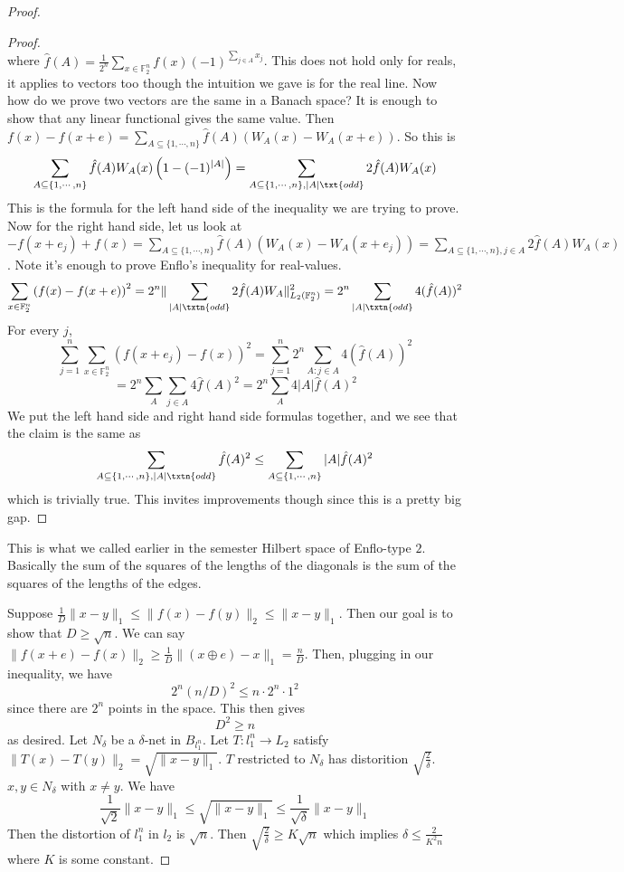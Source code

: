 \begin{proof}
\begin{proof}
\[\]
where $\hat{f}(A) = \frac{1}{2^n}\sum_{x \in \mathbb{F}_2^n} f(x)(-1)^{\sum_{j \in A}x_j}$.
This does not hold only for reals, it applies to vectors too though the intuition we gave is for the real line. 
Now how do we prove two vectors are the same in a Banach space? It is enough to show that any linear functional gives the same value. 
Then $f(x) - f(x + e) = \sum_{A \subseteq \{1, \cdots, n\}} \hat{f}(A)\left(W_A(x) - W_A(x + e)\right)$. So this is 
\[
\sum_{A \subseteq \{1, \cdots, n\}} \hat{f}(A)W_A(x)\left(1 - (-1)^{|A|}\right) = \sum_{A \subseteq \{1, \cdots, n\}, |A| \txt{ odd}} 2\hat{f}(A)W_A(x)
\]
This is the formula for the left hand side of the inequality we are trying to prove. 
Now for the right hand side, let us look at $-f(x + e_j) + f(x) = \sum_{A \subseteq \{1, \cdots, n\}} \hat{f}(A)(W_A(x) - W_A(x + e_j)) = \sum_{A \subseteq \{1, \cdots, n\}, j \in A} 2\hat{f}(A)W_A(x)$. Note it's enough to prove Enflo's inequality for real-values. 
\[
\sum_{x \in \mathbb{F}_2^n}\left(f(x) - f(x + e)\right)^2 = 2^n \|\sum_{|A| \txtn{ odd}} 2\hat{f}(A)W_A\|_{L_2(\mathbb{F}_2^n)}^2 = 2^n \sum_{|A| \txtn{ odd}} 4(\hat{f}(A))^2
\]
For every $j$, 
\[
\sum_{j = 1}^n \sum_{x \in \mathbb{F}_2^n} \left(f(x + e_j) - f(x)\right)^2 = \sum_{j = 1}^n 2^n \sum_{A: j \in A} 4\left(\hat{f}(A)\right)^2
\]
\[
= 2^n \sum_A \sum_{j \in A} 4\hat{f}(A)^2 = 2^n\sum_{A} 4|A|\hat{f}(A)^2
\]
We put the left hand side and right hand side formulas together, and we see that the claim is the same as 
\[
\sum_{A \subseteq \{1, \cdots, n\}, |A| \txtn{ odd}} \hat{f}(A)^2 \leq \sum_{A \subseteq \{1, \cdots, n\}}|A|\hat{f}(A)^2
\]
which is trivially true. This invites improvements though since this is a pretty big gap. 
\end{proof}
This is what we called earlier in the semester Hilbert space of Enflo-type $2$. Basically the sum of the squares of the lengths of the diagonals is the sum of the squares of the lengths of the edges. 

Suppose $\frac{1}{D}\|x - y\|_1 \leq \|f(x) - f(y)\|_2 \leq \|x - y\|_1$. Then our goal is to show that $D \geq \sqrt{n}$. We can say $\|f(x + e) - f(x)\|_2 \geq \frac{1}{D}\|(x \oplus e) - x\|_1 = \frac{n}{D}$. Then, plugging in our inequality, we have 
\[
2^n(n/D)^2 \leq n\cdot 2^n \cdot 1^2
\]
since there are $2^n$ points in the space. This then gives
\[
D^2 \geq n
\]
as desired.
Let $N_{\delta}$ be a $\delta$-net in $B_{l_1^n}$. Let $T: l_1^n \to L_2$ satisfy $\|T(x) - T(y)\|_2 = \sqrt{\|x - y\|_1}$. $T$ restricted to $N_{\delta}$ has distorition $\sqrt{\frac{2}{\delta}}$. $x, y \in N_{\delta}$ with $x \neq y$. 
We have
\[
\frac{1}{\sqrt{2}}\|x - y\|_1 \leq \sqrt{\|x - y\|_1} \leq \frac{1}{\sqrt{\delta}} \|x - y\|_1
\]
Then the distortion of $l_1^n$ in $l_2$ is $\sqrt{n}$. Then $\sqrt{\frac{2}{\delta}} \geq K\sqrt{n}$ which implies $\delta \leq \frac{2}{K^2n}$ where $K$ is some constant. 
\end{proof}

